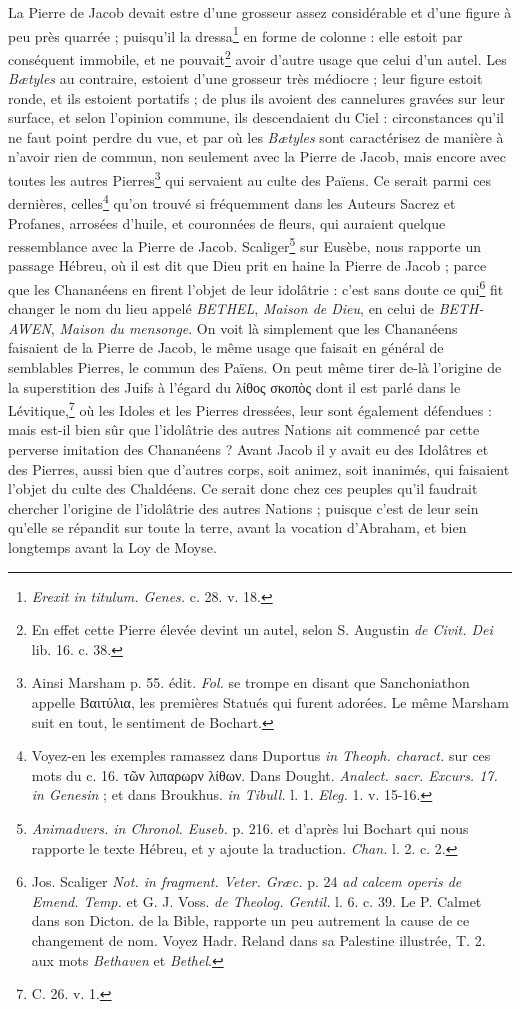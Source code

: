 \documentclass[a4paper, 11pt, oneside, polutonikogreek, french]{article}
\begin{document}
La Pierre de Jacob devait estre d'une grosseur assez considérable et d'une figure à peu près quarrée ; puisqu'il la dressa\footnote{\emph{Erexit in titulum. Genes.} c. 28. v. 18.} en forme de colonne : elle estoit par conséquent immobile, et ne pouvait\footnote{En effet cette Pierre élevée devint un autel, selon S. Augustin \emph{de Civit. Dei} lib. 16. c. 38.} avoir d'autre usage que celui d'un autel. Les \emph{Bætyles} au contraire, estoient d'une grosseur très médiocre ; leur figure estoit ronde, et ils estoient portatifs ; de plus ils avoient des cannelures gravées sur leur surface, et selon l'opinion commune, ils descendaient du Ciel : circonstances qu'il ne faut point perdre du vue, et par où les \emph{Bætyles} sont caractérisez de manière à n'avoir rien de commun, non seulement avec la Pierre de Jacob, mais encore avec toutes les autres Pierres\footnote{Ainsi Marsham p. 55. édit. \emph{Fol.} se trompe en disant que Sanchoniathon appelle Βαιτύλια, les premières Statués qui furent adorées. Le même Marsham suit en tout, le sentiment de Bochart.} qui servaient au culte des Païens. Ce serait parmi ces dernières, celles\footnote{Voyez-en les exemples ramassez dans Duportus \emph{in Theoph. charact.} sur ces mots du c. 16. τῶν λιπαρωρν λίθων. Dans Dought. \emph{Analect. sacr. Excurs. 17. in Genesin} ; et dans Broukhus. \emph{in Tibull.} l. 1. \emph{Eleg.} 1. v. 15-16.} qu'on trouvé si fréquemment dans les Auteurs Sacrez et Profanes, arrosées d'huile, et couronnées de fleurs, qui auraient quelque ressemblance avec la Pierre de Jacob. Scaliger\footnote{\emph{Animadvers. in Chronol. Euseb.} p. 216. et d'après lui Bochart qui nous rapporte le texte Hébreu, et y ajoute la traduction. \emph{Chan.} l. 2. c. 2.} sur Eusèbe, nous rapporte un passage Hébreu, où il est dit que Dieu prit en haine la Pierre de Jacob ; parce que les Chananéens en firent l'objet de leur idolâtrie : c'est sans doute ce qui\footnote{Jos. Scaliger \emph{Not. in fragment. Veter. Græc.} p. 24 \emph{ad calcem operis de Emend. Temp.} et G. J. Voss. \emph{de Theolog. Gentil.} l. 6. c. 39. Le P. Calmet dans son Dicton. de la Bible, rapporte un peu autrement la cause de ce changement de nom. Voyez Hadr. Reland dans sa Palestine illustrée, T. 2. aux mots \emph{Bethaven} et \emph{Bethel}.} fit changer le nom du lieu appelé \emph{BETHEL}, \emph{Maison de Dieu}, en celui de \emph{BETH-AWEN}, \emph{Maison du mensonge}. On voit là simplement que les Chananéens faisaient de la Pierre de Jacob, le même usage que faisait en général de semblables Pierres, le commun des Païens. On peut même tirer de-là l'origine de la superstition des Juifs à l'égard du λίθος σκοπὸς dont il est parlé dans le Lévitique,\footnote{C. 26. v. 1.} où les Idoles et les Pierres dressées, leur sont également défendues : mais est-il bien sûr que l'idolâtrie des autres Nations ait commencé par cette perverse imitation des Chananéens ? Avant Jacob il y avait eu des Idolâtres et des Pierres, aussi bien que d'autres corps, soit animez, soit inanimés, qui faisaient l'objet du culte des Chaldéens. Ce serait donc chez ces peuples qu'il faudrait chercher l'origine de l'idolâtrie des autres Nations ; puisque c'est de leur sein qu'elle se répandit sur toute la terre, avant la vocation d'Abraham, et bien longtemps avant la Loy de Moyse.
\end{document}
